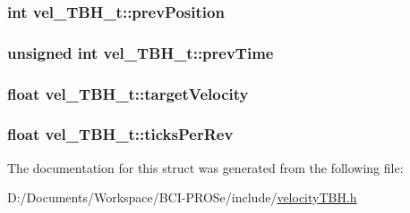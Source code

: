 \subsubsection[{\texorpdfstring{prev\+Position}{prevPosition}}]{\setlength{\rightskip}{0pt plus 5cm}int vel\+\_\+\+T\+B\+H\+\_\+t\+::prev\+Position}\hypertarget{structvel___t_b_h__t_a8a73c7f0d58d5c618e79fd115991ae3e}{}\label{structvel___t_b_h__t_a8a73c7f0d58d5c618e79fd115991ae3e}
\subsubsection[{\texorpdfstring{prev\+Time}{prevTime}}]{\setlength{\rightskip}{0pt plus 5cm}unsigned int vel\+\_\+\+T\+B\+H\+\_\+t\+::prev\+Time}\hypertarget{structvel___t_b_h__t_ad78d9da9d240113ebb07ae8718f59754}{}\label{structvel___t_b_h__t_ad78d9da9d240113ebb07ae8718f59754}
\subsubsection[{\texorpdfstring{target\+Velocity}{targetVelocity}}]{\setlength{\rightskip}{0pt plus 5cm}float vel\+\_\+\+T\+B\+H\+\_\+t\+::target\+Velocity}\hypertarget{structvel___t_b_h__t_a32592241f4affebd8af140c787df2d61}{}\label{structvel___t_b_h__t_a32592241f4affebd8af140c787df2d61}
\subsubsection[{\texorpdfstring{ticks\+Per\+Rev}{ticksPerRev}}]{\setlength{\rightskip}{0pt plus 5cm}float vel\+\_\+\+T\+B\+H\+\_\+t\+::ticks\+Per\+Rev}\hypertarget{structvel___t_b_h__t_a23391a4f1701b22da1c18fa62ef16ec9}{}\label{structvel___t_b_h__t_a23391a4f1701b22da1c18fa62ef16ec9}


The documentation for this struct was generated from the following file\+:\begin{DoxyCompactItemize}
\item 
D\+:/\+Documents/\+Workspace/\+B\+C\+I-\/\+P\+R\+O\+Se/include/\hyperlink{velocity_t_b_h_8h}{velocity\+T\+B\+H.\+h}\end{DoxyCompactItemize}
